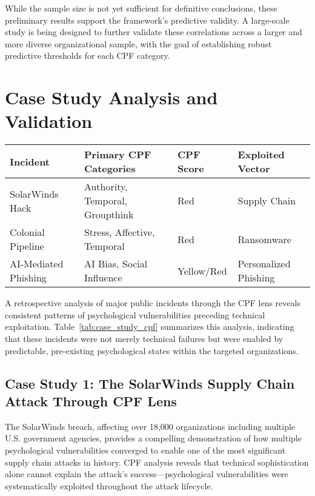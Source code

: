 \documentclass[manuscript,screen,review]{acmart}
\begin{document}
While the sample size is not yet sufficient for definitive conclusions, these preliminary results support the framework's predictive validity. A large-scale study is being designed to further validate these correlations across a larger and more diverse organizational sample, with the goal of establishing robust predictive thresholds for each CPF category.

\section{Case Study Analysis and Validation}

\begin{table*}
\caption{Retrospective CPF Analysis of Major Incidents}
\label{tab:case_study_cpf}
\centering
\begin{tabular}{@{}l l l l@{}}
\toprule
\textbf{Incident} & \textbf{Primary CPF Categories} & \textbf{CPF Score} & \textbf{Exploited Vector} \\
\midrule
SolarWinds Hack & Authority, Temporal, Groupthink & Red & Supply Chain \\
\midrule
Colonial Pipeline & Stress, Affective, Temporal & Red & Ransomware \\
\midrule
AI-Mediated Phishing & AI Bias, Social Influence & Yellow/Red & Personalized Phishing \\
\bottomrule
\end{tabular}
\end{table*}

\noindent A retrospective analysis of major public incidents through the CPF lens reveals consistent patterns of psychological vulnerabilities preceding technical exploitation. Table~\ref{tab:case_study_cpf} summarizes this analysis, indicating that these incidents were not merely technical failures but were enabled by predictable, pre-existing psychological states within the targeted organizations.

\subsection{Case Study 1: The SolarWinds Supply Chain Attack Through CPF Lens}

The SolarWinds breach, affecting over 18,000 organizations including multiple U.S. government agencies, provides a compelling demonstration of how multiple psychological vulnerabilities converged to enable one of the most significant supply chain attacks in history. CPF analysis reveals that technical sophistication alone cannot explain the attack's success—psychological vulnerabilities were systematically exploited throughout the attack lifecycle.
\end{document}

